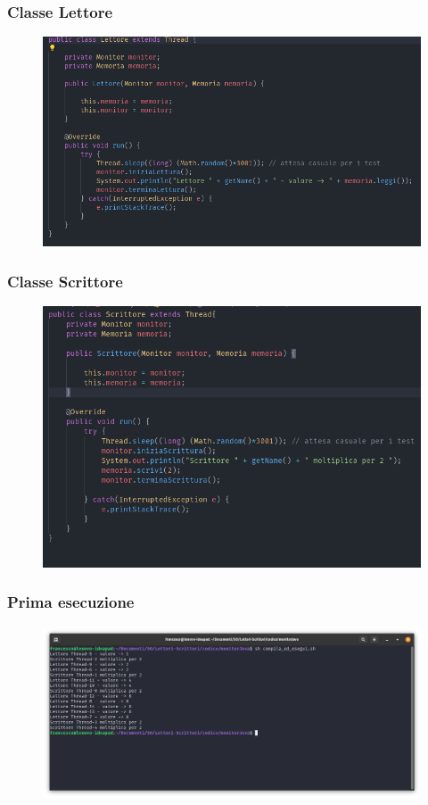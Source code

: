 \documentclass[10pt]{beamer}
\begin{document}
\begin{frame}
	\frametitle{Classe Lettore}
		\begin{figure}
			\centering
			\includegraphics[width=\linewidth]{img/lettore_java}
		\end{figure}
\end{frame}
\begin{frame}
	\frametitle{Classe Scrittore}
	\begin{figure}
		\centering
		\includegraphics[width=\linewidth]{img/scrittore_java}
	\end{figure}
\end{frame}

	\begin{frame}[fragile]
		\frametitle{Prima esecuzione}
		\begin{figure}
			\centering
			\includegraphics[width=1.03\linewidth]{img/esecuzione/programJ1}
			\label{fig:programc1}
		\end{figure}
	\end{frame}
\end{document}
